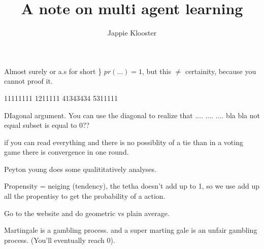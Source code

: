 \documentclass{article}
\begin{document}
\author{Jappie Klooster}
\title{A note on multi agent learning}

\maketitle

Almost surely or a.s for short \} $pr(\dots) = 1$, but this $\neq$ certainity,
because you cannot proof it.

11111111
1211111
41343434
5311111

DIagonal argument. You can use the diagonal to realize
that .... .... .... bla bla not equal subset is equal to 0??

if you can read everything and there is no possiblity of a tie than in a
voting game there is convergence in one round.

Peyton young does some qualititatively analyses.

Propensity = neiging (tendency), the tetha doesn't add up to 1, so
we use add up all the propentisy to get the probability of a action.

Go to the website and do geometric vs plain average.

Martingale is a gambling process. and a super marting gale is
an unfair gambling process. (You'll eventually reach 0).
\end{document}
